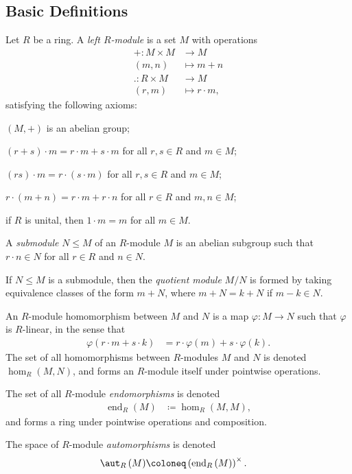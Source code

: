 \documentclass[10pt]{mypackage}
\begin{document}
\subsection{Basic Definitions}%
\begin{definition}
  Let $R$ be a ring. A \textit{left $R$-module} is a set $M$ with operations
  \begin{align*}
    +\colon M\times M&\rightarrow M\\
    \left( m,n \right) &\mapsto m+n\\
    .\colon R\times M&\rightarrow M\\
    \left( r,m \right) &\mapsto r\cdot m,
  \end{align*}
  satisfying the following axioms:
  \begin{description}[font=\normalfont]
    \item[(M0)] $\left( M,+ \right)$ is an abelian group;
    \item[(M1)] $\left( r+s \right)\cdot m = r\cdot m + s\cdot m$ for all $r,s\in R$ and $m\in M$;
    \item[(M2)] $\left( rs \right)\cdot m = r\cdot \left( s\cdot m \right)$ for all $r,s\in R$ and $m\in M$;
    \item[(M3)] $r\cdot \left( m+n \right) = r\cdot m + r\cdot n$ for all $r\in R$ and $m,n\in M$;
    \item[(M4)] if $R$ is unital, then $1\cdot m = m$ for all $m\in M$.
  \end{description}
  A \textit{submodule} $N\leq M$ of an $R$-module $M$ is an abelian subgroup such that $r\cdot n\in N$ for all $r\in R$ and $n\in N$.
\end{definition}
\begin{definition}
  If $N\leq M$ is a submodule, then the \textit{quotient module} $M/N$ is formed by taking equivalence classes of the form $m + N$, where $m+N = k + N$ if $m-k\in N$.
\end{definition}
\begin{definition}
  An $R$-module homomorphism between $M$ and $N$ is a map $\varphi\colon M\rightarrow N$ such that $\varphi$ is $R$-linear, in the sense that
  \begin{align*}
    \varphi\left( r\cdot m + s\cdot k \right) &= r\cdot\varphi(m) + s\cdot \varphi(k).
  \end{align*}
  The set of all homomorphisms between $R$-modules $M$ and $N$ is denoted $\hom_R(M,N)$, and forms an $R$-module itself under pointwise operations.\newline

  The set of all $R$-module \textit{endomorphisms} is denoted
  \begin{align*}
    \operatorname{end}_R(M) &\coloneq \hom_R\left( M,M \right),
  \end{align*}
  and forms a ring under pointwise operations and composition.\newline

  The space of $R$-module \textit{automorphisms} is denoted
  \begin{align*}
    \aut_R\left( M \right) &\coloneq \left( \operatorname{end}_R\left( M \right) \right)^{\times}.
  \end{align*}
\end{definition}
\end{document}
